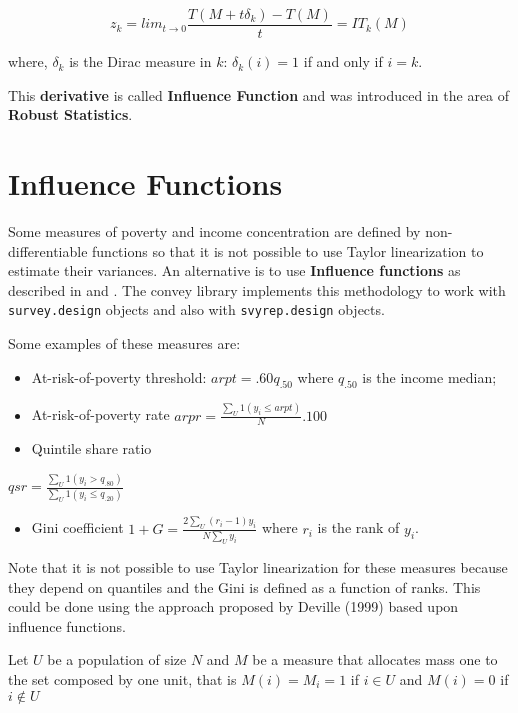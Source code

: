 \documentclass[
]{book}
\providecommand{\tightlist}{%
  \setlength{\itemsep}{0pt}\setlength{\parskip}{0pt}}
\begin{document}
\begin{equation}
z_k=lim_{t\rightarrow0}\frac{T(M+t\delta_k)-T(M)}{t}=IT_k(M)
\label{eq:lin}
\end{equation}

where, \(\delta_k\) is the Dirac measure in \(k\): \(\delta_k(i)=1\) if and only if \(i=k\).

This \textbf{derivative} is called \textbf{Influence Function} and was introduced in the area of \textbf{Robust Statistics}.

\hypertarget{influence-functions}{%
\section{Influence Functions}\label{influence-functions}}

Some measures of poverty and income concentration are defined by non-differentiable functions so that it is not possible to use Taylor linearization to estimate their variances. An alternative is to use \textbf{Influence functions} as described in \textcite{deville1999} and \textcite{osier2009}. The convey library implements this methodology to work with \texttt{survey.design} objects and also with \texttt{svyrep.design} objects.

Some examples of these measures are:

\begin{itemize}
\item
  At-risk-of-poverty threshold:
  \(arpt=.60q_{.50}\) where \(q_{.50}\) is the income median;
\item
  At-risk-of-poverty rate
  \(arpr=\frac{\sum_U 1(y_i \leq arpt)}{N}.100\)
\item
  Quintile share ratio
\end{itemize}

\(qsr=\frac{\sum_U 1(y_i>q_{.80})}{\sum_U 1(y_i\leq q_{.20})}\)

\begin{itemize}
\tightlist
\item
  Gini coefficient
  \(1+G=\frac{2\sum_U (r_i-1)y_i}{N\sum_Uy_i}\)
  where \(r_i\) is the rank of \(y_i\).
\end{itemize}

Note that it is not possible to use Taylor linearization for these measures because they depend on quantiles and the Gini is defined as a function of ranks. This could be done using the approach proposed by Deville (1999) based upon influence functions.

Let \(U\) be a population of size \(N\) and \(M\) be a measure that allocates mass one to the set composed by one unit, that is \(M(i)=M_i= 1\) if \(i\in U\) and \(M(i)=0\) if \(i\notin U\)
\end{document}
